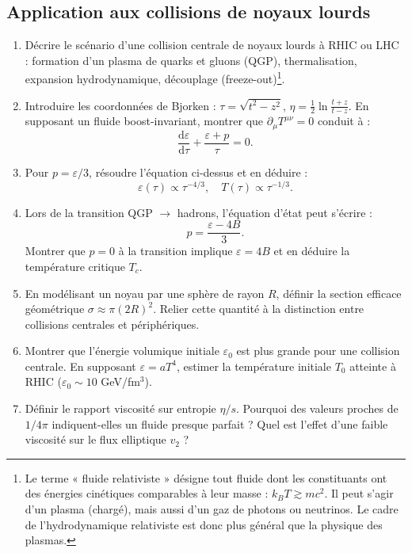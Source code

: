 \documentclass[a4paper,10pt]{report}
\begin{document}
\subsection{Application aux collisions de noyaux lourds}

\begin{enumerate}
	\item D\'ecrire le sc\'enario d'une collision centrale de noyaux lourds \`a RHIC ou LHC : formation d’un plasma de quarks et gluons (QGP), thermalisation, expansion hydrodynamique, d\'ecouplage (freeze-out)\footnote{Le terme « fluide relativiste » désigne tout fluide dont les constituants ont des énergies cinétiques comparables à leur masse : \( k_BT \gtrsim mc^2 \). Il peut s’agir d’un plasma (chargé), mais aussi d’un gaz de photons ou neutrinos. Le cadre de l’hydrodynamique relativiste est donc plus général que la physique des plasmas.}.
	
	\item Introduire les coordonn\'ees de Bjorken : $\tau = \sqrt{t^2 - z^2}$, $\eta = \frac{1}{2} \ln\frac{t+z}{t-z}$. En supposant un fluide boost-invariant, montrer que $\partial_\mu T^{\mu\nu} = 0$ conduit \`a :
	\[ \frac{\text{d}\varepsilon}{\text{d}\tau} + \frac{\varepsilon + p}{\tau} = 0. \]
	
	\item Pour $p = \varepsilon/3$, r\'esoudre l'\'equation ci-dessus et en d\'eduire :
	\[ \varepsilon(\tau) \propto \tau^{-4/3}, \quad T(\tau) \propto \tau^{-1/3}. \]
	
	\item Lors de la transition QGP $\rightarrow$ hadrons, l'\'equation d'\'etat peut s'\'ecrire :
	\[ p = \frac{\varepsilon - 4B}{3}. \]
	Montrer que $p=0$ \`a la transition implique $\varepsilon = 4B$ et en d\'eduire la temp\'erature critique $T_c$.
	
	\item En mod\'elisant un noyau par une sph\`ere de rayon $R$, d\'efinir la section efficace g\'eom\'etrique $\sigma \approx \pi (2R)^2$. Relier cette quantit\'e \`a la distinction entre collisions centrales et p\'eriph\'eriques.
	
	\item Montrer que l’\'energie volumique initiale $\varepsilon_0$ est plus grande pour une collision centrale. En supposant $\varepsilon = a T^4$, estimer la temp\'erature initiale $T_0$ atteinte \`a RHIC ($\varepsilon_0 \sim 10$ GeV/fm$^3$).
	
	\item D\'efinir le rapport viscosit\'e sur entropie $\eta/s$. Pourquoi des valeurs proches de $1/4\pi$ indiquent-elles un fluide presque parfait ? Quel est l'effet d’une faible viscosit\'e sur le flux elliptique $v_2$ ?
	

\end{enumerate}
\end{document}
